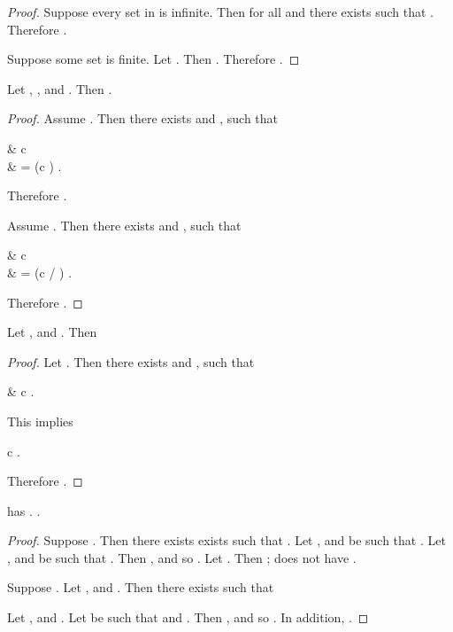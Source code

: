 \documentclass[b5paper, english, oneside]{memoir}
\begin{document}
\begin{proof}
\proofpart{}
Suppose every set in  is infinite. Then for all  and  there exists  such that . Therefore .

\proofpart{}
Suppose some set  is finite. Let . Then . Therefore .
\end{proof}

\begin{theorem}
\label{LocalScaleInvariance}
Let , , and . Then . 
\end{theorem}

\begin{proof}
\proofpart{}
Assume . Then there exists  and , such that
\begin{eqs}
 & \lt c  \\
{} & = (c \alpha) .
\end{eqs}
Therefore . 

\proofpart{}
Assume . Then there exists  and , such that
\begin{eqs}
 & \lt c  \\
{} & = (c / \alpha) .
\end{eqs}
Therefore .

\end{proof}

\begin{theorem}
\label{LocalSubHomogenuity}
Let , and . Then 

\end{theorem}

\begin{proof}
Let . Then there exists  and , such that
\begin{eqs}
 & \lt c .
\end{eqs}
This implies
\begin{eqs}
 \lt c .
\end{eqs}
Therefore .
\end{proof}

\begin{theorem}
\label{LocalSuperHomogenuityCharacterized}
 has .  .
\end{theorem}

\begin{proof}
\proofpart{}
Suppose . Then there exists exists  such that . Let , and  be such that . Let , and  be such that . Then , and so . Let . Then ;  does not have .

\proofpart{}
Suppose . Let , and . Then there exists  such that

Let , and . Let  be such that  and . Then , and so . In addition, . 
\end{proof}
\end{document}
